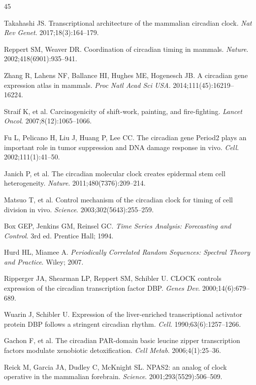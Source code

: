 \documentclass[11pt,letterpaper]{article}
\begin{document}

\begin{thebibliography}{45}

Takahashi JS. Transcriptional architecture of the mammalian circadian clock. \textit{Nat Rev Genet}. 2017;18(3):164--179.

Reppert SM, Weaver DR. Coordination of circadian timing in mammals. \textit{Nature}. 2002;418(6901):935--941.

Zhang R, Lahens NF, Ballance HI, Hughes ME, Hogenesch JB. A circadian gene expression atlas in mammals. \textit{Proc Natl Acad Sci USA}. 2014;111(45):16219--16224.

Straif K, et al. Carcinogenicity of shift-work, painting, and fire-fighting. \textit{Lancet Oncol}. 2007;8(12):1065--1066.

Fu L, Pelicano H, Liu J, Huang P, Lee CC. The circadian gene Period2 plays an important role in tumor suppression and DNA damage response in vivo. \textit{Cell}. 2002;111(1):41--50.

Janich P, et al. The circadian molecular clock creates epidermal stem cell heterogeneity. \textit{Nature}. 2011;480(7376):209--214.

Matsuo T, et al. Control mechanism of the circadian clock for timing of cell division in vivo. \textit{Science}. 2003;302(5643):255--259.

Box GEP, Jenkins GM, Reinsel GC. \textit{Time Series Analysis: Forecasting and Control}. 3rd ed. Prentice Hall; 1994.

Hurd HL, Miamee A. \textit{Periodically Correlated Random Sequences: Spectral Theory and Practice}. Wiley; 2007.

Ripperger JA, Shearman LP, Reppert SM, Schibler U. CLOCK controls expression of the circadian transcription factor DBP. \textit{Genes Dev}. 2000;14(6):679--689.

Wuarin J, Schibler U. Expression of the liver-enriched transcriptional activator protein DBP follows a stringent circadian rhythm. \textit{Cell}. 1990;63(6):1257--1266.

Gachon F, et al. The circadian PAR-domain basic leucine zipper transcription factors modulate xenobiotic detoxification. \textit{Cell Metab}. 2006;4(1):25--36.

Reick M, Garcia JA, Dudley C, McKnight SL. NPAS2: an analog of clock operative in the mammalian forebrain. \textit{Science}. 2001;293(5529):506--509.


\end{thebibliography}
\end{document}
